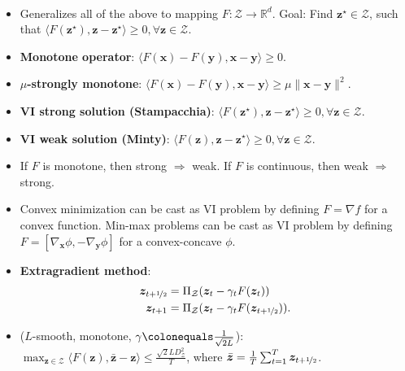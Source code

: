 \documentclass[8pt,a4paper]{extarticle}
\newcommand{\R}{\mathbb{R}}
\renewcommand{\vec}[1]{\bm{#1}}
\newenvironment{topic}[1]
{\textbf{\sffamily \colorbox{black}{\rlap{\textbf{\textcolor{white}{#1}}}\hspace{\linewidth}\hspace{-2\fboxsep}}} \\ \vspace{0.2cm}}
{}
\begin{document}
\begin{multicols*}{2}
    \begin{topic}{Variational inequalities}
        \begin{itemize}
            \item Generalizes all of the above to mapping $F: \mathcal{Z} \to \R^d$. Goal: Find $\vec{z}^\star \in
                      \mathcal{Z}$, such that $\langle F(\vec{z}^\star), \vec{z} - \vec{z}^\star \rangle \geq 0, \forall
                      \vec{z} \in \mathcal{Z}$.
            \item \textbf{Monotone operator}: $\langle F(\vec{x}) - F(\vec{y}), \vec{x} - \vec{y} \rangle \geq 0$.
            \item \textbf{$\mu$-strongly monotone}: $\langle F(\vec{x}) - F(\vec{y}), \vec{x} - \vec{y} \rangle \geq \mu \| \vec{x} - \vec{y} \|^2$.
            \item \textbf{VI strong solution (Stampacchia)}: $\langle F(\vec{z}^\star), \vec{z} - \vec{z}^\star \rangle \geq 0, \forall \vec{z} \in \mathcal{Z}$.
            \item \textbf{VI weak solution (Minty)}: $\langle F(\vec{z}), \vec{z} - \vec{z}^\star \rangle \geq 0, \forall \vec{z} \in \mathcal{Z}$.
            \item If $F$ is monotone, then strong $\Rightarrow$ weak. If $F$ is continuous, then weak $\Rightarrow$
                  strong.
            \item Convex minimization can be cast as VI problem by defining $F = \nabla f$ for a convex function.
                  Min-max problems can be cast as VI problem by defining $F = [\nabla_{\vec{x}} \phi,
                      -\nabla_{\vec{y}} \phi]$ for a convex-concave $\phi$.
            \item \textbf{Extragradient method}:
                  \begin{align*}
                      \vec{z}_{t+\nicefrac{1}{2}} & = \Pi_{\mathcal{Z}}(\vec{z}_t - \gamma_t F(\vec{z}_t))                    \\
                      \vec{z}_{t+1}               & = \Pi_{\mathcal{Z}}(\vec{z}_t - \gamma_t F(\vec{z}_{t+\nicefrac{1}{2}})).
                  \end{align*}
            \item ($L$-smooth, monotone, $\gamma \colonequals \frac{1}{\sqrt{2L}}$): $\max_{\vec{z} \in \mathcal{Z}} \langle F(\vec{z}), \bar{\vec{z}} - \vec{z} \rangle \leq \frac{\sqrt{2} LD_{\mathcal{Z}}^2}{T}$, where $\bar{\vec{z}} = \frac{1}{T} \sum_{t=1}^{T} \vec{z}_{t+\nicefrac{1}{2}}$.

\end{itemize}
\end{topic}
\end{multicols*}
\end{document}
